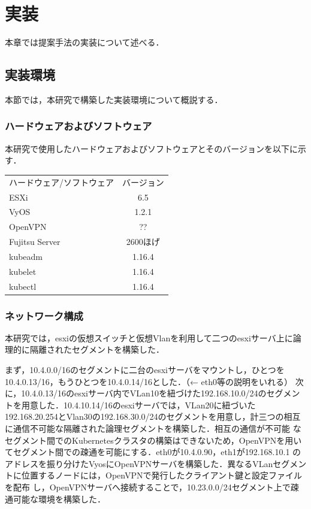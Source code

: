 \chapter{実装}
\label{implementation}

本章では提案手法の実装について述べる．

\section{実装環境}
\label{implementation:environment}
本節では，本研究で構築した実装環境について概説する．

\subsection{ハードウェアおよびソフトウェア}
\label{implementation:environment:resouces}
本研究で使用したハードウェアおよびソフトウェアとそのバージョンを以下に示す．

\begin{table}[htb]
  \begin{tabular}{lc}
    ハードウェア/ソフトウェア & バージョン \\
    ESXi & 6.5 \\
    VyOS & 1.2.1 \\
    OpenVPN & ?? \\
    Fujitsu Server & 2600ほげ \\
    kubeadm & 1.16.4 \\
    kubelet & 1.16.4 \\
    kubectl & 1.16.4 \\
  \end{tabular}
\end{table}

\subsection{ネットワーク構成}
\label{implementation:network-environment}
本研究では，esxiの仮想スイッチと仮想Vlanを利用して二つのesxiサーバ上に論理的に隔離されたセグメントを構築した．

まず，10.4.0.0/16のセグメントに二台のesxiサーバをマウントし，ひとつを10.4.0.13/16，もうひとつを10.4.0.14/16とした．（← eth0等の説明をいれる）
次に，10.4.0.13/16のesxiサーバ内でVLan10を紐づけた192.168.10.0/24のセグメントを用意した．10.4.10.14/16のesxiサーバでは，VLan20に紐づいた
192.168.20.254とVlan30の192.168.30.0/24のセグメントを用意し，計三つの相互に通信不可能な隔離された論理セグメントを構築した．相互の通信が不可能
なセグメント間でのKubernetesクラスタの構築はできないため，OpenVPNを用いてセグメント間での疎通を可能にする．eth0が10.4.0.90，eth1が192.168.10.1
のアドレスを振り分けたVyosにOpenVPNサーバを構築した．異なるVLanセグメントに位置するノードには，OpenVPNで発行したクライアント鍵と設定ファイルを配布
し，OpenVPNサーバへ接続することで，10.23.0.0/24セグメント上で疎通可能な環境を構築した．

